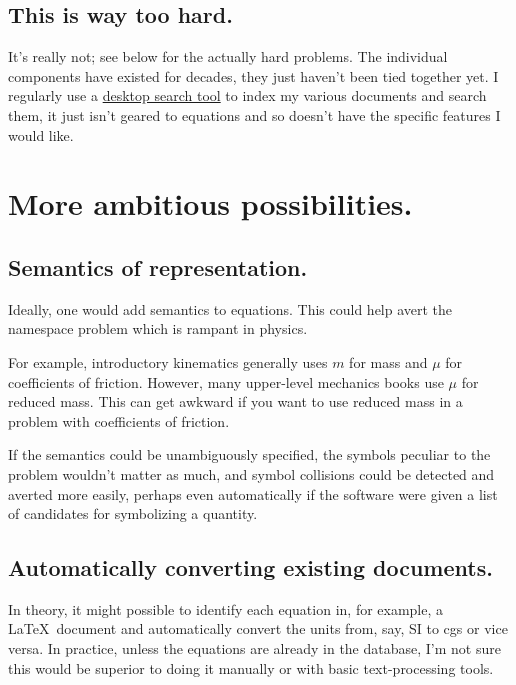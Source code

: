 \documentclass[12pt,letterpaper]{article}
\begin{document}
\subsection{This is way too hard.}

It's really not; see below for the actually hard problems. The individual components have existed for decades, they just haven't been tied together yet. I regularly use a \href{https://en.wikipedia.org/wiki/Recoll}{desktop search tool} to index my various documents and search them, it just isn't geared to equations and so doesn't have the specific features I would like.

\section{More ambitious possibilities.}

\subsection{Semantics of representation.}

Ideally, one would add semantics to equations. This could help avert the namespace problem which is rampant in physics.

For example, introductory kinematics generally uses $m$ for mass and $\mu$ for coefficients of friction. However, many upper-level mechanics books use $\mu$ for reduced mass. This can get awkward if you want to use reduced mass in a problem with coefficients of friction.

If the semantics could be unambiguously specified, the symbols peculiar to the problem wouldn't matter as much, and symbol collisions could be detected and averted more easily, perhaps even automatically if the software were given a list of candidates for symbolizing a quantity.

\subsection{Automatically converting existing documents.}

In theory, it might possible to identify each equation in, for example, a \LaTeX\ document and automatically convert the units from, say, SI to cgs or vice versa. In practice, unless the equations are already in the database, I'm not sure this would be superior to doing it manually or with basic text-processing tools.
\end{document}
